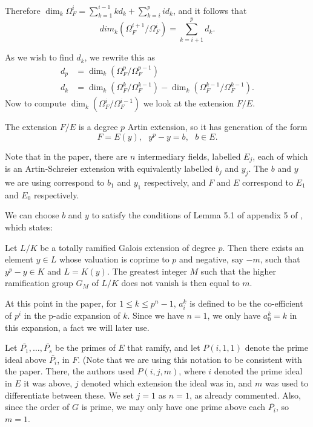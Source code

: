 Therefore $\dim_k\Omega_F^i = \sum _{k=1}^{i-1} kd_k + \sum_{k=i}^p id_k$, and it follows that 
    \[
    dim_k(\Omega_F^{i+1}/\Omega_F^i) = \sum_{k=i+1}^p d_k.
    \]

As we wish to find $d_k$, we rewrite this as 
    \begin{align*}
    d_p & =  \dim_k(\Omega_F^p/\Omega_F^{p-1}) \\
    d_k & =  \dim_k(\Omega_F^k/\Omega_F^{k-1}) - \dim_k(\Omega_F^{k-1}/\Omega_F^{k-1}).
    \end{align*}
Now to compute $\dim_k(\Omega_F^i/\Omega_F^{i-1})$ we look at the extension $F/E$.


The extension $F/E$ is a degree $p$ Artin extension, so it has generation of the form 
    \[
    F=E(y), \mbox{	} y^p-y = b, \mbox{	} b\in E.
    \]

Note that in the paper, there are $n$ intermediary fields, labelled $E_j$, each of which is an Artin-Schreier extension with equivalently labelled $b_j$ and $y_j$.
The $b$ and $y$ we are using correspond to $b_1$ and $y_1$ respectively, and $F$ and $E$ correspond to $E_1$ and $E_0$ respectively.


We can choose $b$ and $y$ to satisfy the conditions of Lemma 5.1 of appendix 5 of \cite{quaddiffequi}, which states:


    \begin{lem}\label{koeck}
    Let $L/K$ be a totally ramified Galois extension of degree $p$.
    Then there exists an element $y \in L$ whose valuation is coprime to $p$ and
    negative, say $-m$, such that $y^p - y \in K$ and $L = K(y)$. The greatest
    integer $M$ such that the higher ramification group $G_M$ of $L/K$ does not vanish
    is then equal to $m$.
    \end{lem}


At this point in the paper, for $1\leq k \leq p^n-1$, $a_i^k$ is defined to be the co-efficient of $p^i$ in the p-adic expansion of $k$. 
Since we have $n=1$, we only have $a_0^k = k$ in this expansion, a fact we will later use.

Let $\bar{P_1},\dots , \bar{P_s}$ be the primes of $E$ that ramify, and let $P(i,1,1)$ denote the prime ideal above $\bar{P_i}$, in $F$.
(Note that we are using this notation to be consistent with the paper. 
There, the authors used $P(i,j,m)$, where $i$ denoted the prime ideal in $E$ it was above, $j$ denoted which extension the ideal was in, and $m$ was used to differentiate between these.
We set $j=1$ as $n=1$, as already commented.
Also, since the order of $G$ is prime, we may only have one prime above each $\bar{P_i}$, so $m=1$.


